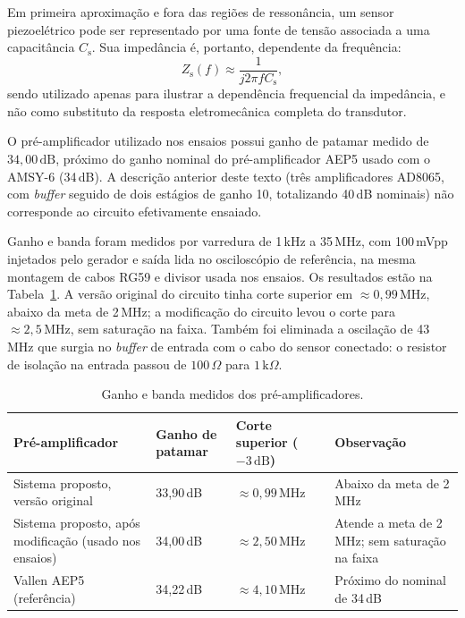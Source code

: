 Em primeira aproximação e fora das regiões de ressonância, um sensor piezoelétrico pode ser representado por uma fonte de tensão associada a uma capacitância \(C_{\mathrm{s}}\). Sua impedância é, portanto, dependente da frequência:
\begin{equation}
	Z_{\mathrm{s}}(f)
	\approx
	\frac{1}{j2\pi f C_{\mathrm{s}}},
	\label{v2:eq:impedancia_sensor}
\end{equation}
sendo utilizado apenas para ilustrar a dependência frequencial da impedância, e não como substituto da resposta eletromecânica completa do transdutor.

O pré-amplificador utilizado nos ensaios possui ganho de patamar medido de \(34{,}00\,\mathrm{dB}\), próximo do ganho nominal do pré-amplificador AEP5 usado com o AMSY-6 (34\,dB). A descrição anterior deste texto (três amplificadores AD8065, com \textit{buffer} seguido de dois estágios de ganho 10, totalizando 40\,dB nominais) não corresponde ao circuito efetivamente ensaiado.

Ganho e banda foram medidos por varredura de 1\,kHz a 35\,MHz, com 100\,mVpp injetados pelo gerador e saída lida no osciloscópio de referência, na mesma montagem de cabos RG59 e divisor usada nos ensaios. Os resultados estão na Tabela~\ref{v2:tab:preamp_medido}. A versão original do circuito tinha corte superior em \(\approx 0{,}99\,\mathrm{MHz}\), abaixo da meta de 2\,MHz; a modificação do circuito levou o corte para \(\approx 2{,}5\,\mathrm{MHz}\), sem saturação na faixa. Também foi eliminada a oscilação de 43\,MHz que surgia no \textit{buffer} de entrada com o cabo do sensor conectado: o resistor de isolação na entrada passou de \(100\,\Omega\) para \(1\,\mathrm{k}\Omega\).

\begin{table}[htbp]
	\centering
	\footnotesize
		\caption{Ganho e banda medidos dos pré-amplificadores.}
	\label{v2:tab:preamp_medido}
	\begin{tabular}{|p{}|p{}|p{}|p{}|}
		\hline
		\textbf{Pré-amplificador} & \textbf{Ganho de patamar} & \textbf{Corte superior (\(-3\,\mathrm{dB}\))} & \textbf{Observação} \\
		\hline
		Sistema proposto, versão original & 33,90\,dB & \(\approx 0{,}99\,\mathrm{MHz}\) & Abaixo da meta de 2\,MHz \\
		\hline
		Sistema proposto, após modificação (usado nos ensaios) & 34,00\,dB & \(\approx 2{,}50\,\mathrm{MHz}\) & Atende a meta de 2\,MHz; sem saturação na faixa \\
		\hline
		Vallen AEP5 (referência) & 34,22\,dB & \(\approx 4{,}10\,\mathrm{MHz}\) & Próximo do nominal de 34\,dB \\
		\hline
	\end{tabular}
\end{table}

